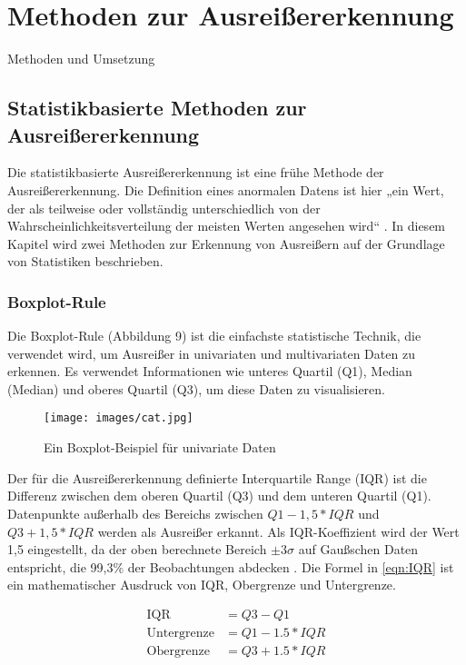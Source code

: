 \chapterpage\chapter{Methoden zur Ausreißererkennung}
        Methoden und Umsetzung
    
        \section{Statistikbasierte Methoden zur Ausreißererkennung}
            Die statistikbasierte Ausreißererkennung ist eine frühe Methode der Ausreißererkennung. Die Definition eines anormalen Datens ist hier „ein Wert, der als teilweise oder vollständig unterschiedlich von der Wahrscheinlichkeitsverteilung der meisten Werten angesehen wird“ \cite{Anscombe60}. In diesem Kapitel wird zwei Methoden zur Erkennung von Ausreißern auf der Grundlage von Statistiken beschrieben.
            
            \subsection{Boxplot-Rule}
                Die Boxplot-Rule (Abbildung 9) ist die einfachste statistische Technik, die verwendet wird, um Ausreißer in univariaten und multivariaten Daten zu erkennen. Es verwendet Informationen wie unteres Quartil (Q1), Median (Median) und oberes Quartil (Q3), um diese Daten zu visualisieren.
                
                \begin{figure}[h]
                    \centering
                    \texttt{[image: images/cat.jpg]}
                    \caption{Ein Boxplot-Beispiel für univariate Daten}
                    \label{fig:IQR}
                \end{figure}
                
                Der für die Ausreißererkennung definierte Interquartile Range (IQR) ist die Differenz zwischen dem oberen Quartil (Q3) und dem unteren Quartil (Q1). Datenpunkte außerhalb des Bereichs zwischen $Q1-1,5*IQR$ und $Q3+1,5*IQR$ werden als Ausreißer erkannt. Als IQR-Koeffizient wird der Wert 1,5 eingestellt, da der oben berechnete Bereich $\pm3\sigma$ auf Gaußschen Daten entspricht, die 99,3\% der Beobachtungen abdecken \cite{Chandola09}. Die Formel in \ref{eqn:IQR} ist ein mathematischer Ausdruck von IQR, Obergrenze und Untergrenze.
                
                \begin{equation}
                    \label{eqn:IQR}
                    \begin{aligned}
                        \text{IQR} & = Q3 - Q1 \\
                        \text{Untergrenze} & = Q1 - 1.5 * IQR \\
                        \text{Obergrenze} & = Q3 + 1.5 * IQR
                    \end{aligned}
                \end{equation}
                
